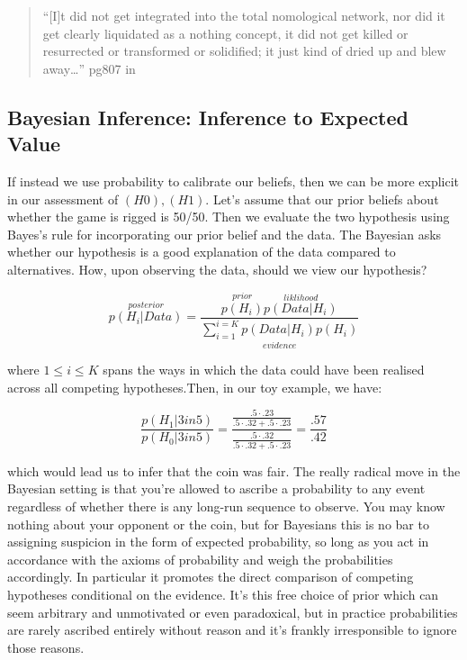 \documentclass[
]{book}
\theoremstyle{definition}
\theoremstyle{definition}
\theoremstyle{definition}
\theoremstyle{remark}
\begin{document}
\begin{quote}
``{[}I{]}t did not get integrated into the total nomological network, nor did it get clearly liquidated as a nothing concept, it did not get killed or resurrected or transformed or solidified; it just kind of dried up and blew away\ldots{}'' pg807 in \citep{MeehlTheoretical}
\end{quote}

\hypertarget{bayesian-inference-inference-to-expected-value}{%
\subsection{Bayesian Inference: Inference to Expected Value}\label{bayesian-inference-inference-to-expected-value}}

If instead we use probability to calibrate our beliefs, then we can be more explicit in our assessment of \((H0), (H1)\). Let's assume that our prior beliefs about whether the game is rigged is 50/50. Then we evaluate the two hypothesis using Bayes's rule for incorporating our prior belief and the data. The Bayesian asks whether our hypothesis is a good explanation of the data compared to alternatives. How, upon observing the data, should we view our hypothesis?

\[ \overset{posterior}{p(H_{i} | Data)} = \frac{\overset{prior}{p(H_{i})}\overset{liklihood}{p(Data | H_{i})}}{\underset{evidence}{\sum_{i=1}^{i =K} p(Data | H_{i})p(H_i)}}\]

where \(1 \leq i \leq K\) spans the ways in which the data could have been realised across all competing hypotheses.Then, in our toy example, we have:

\[ \frac{p(H_1 | 3 in 5)}{p(H_{0} | 3 in 5)} = \frac{\frac{.5\cdot .23}{.5\cdot .32 + .5 \cdot .23}}{\frac{.5\cdot .32}{.5\cdot .32 + .5 \cdot .23}} = \frac{.57}{.42} \]

which would lead us to infer that the coin was fair. The really radical move in the Bayesian setting is that you're allowed to ascribe a probability to any event regardless of whether there is any long-run sequence to observe. You may know nothing about your opponent or the coin, but for Bayesians this is no bar to assigning suspicion in the form of expected probability, so long as you act in accordance with the axioms of probability and weigh the probabilities accordingly. In particular it promotes the direct comparison of competing hypotheses conditional on the evidence. It's this free choice of prior which can seem arbitrary and unmotivated or even paradoxical, but in practice probabilities are rarely ascribed entirely without reason and it's frankly irresponsible to ignore those reasons.
\end{document}
